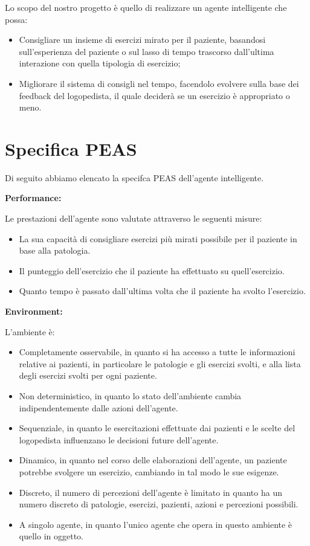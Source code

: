 \documentclass{article}
\begin{document}
    Lo scopo del nostro progetto è quello di realizzare un agente intelligente che possa:

    \begin{itemize}
        \item Consigliare un insieme di esercizi mirato per il paziente, basandosi sull'esperienza del paziente o sul lasso di tempo trascorso dall'ultima interazione con quella tipologia di esercizio;
        \item Migliorare il sistema di consigli nel tempo, facendolo evolvere sulla base dei feedback del logopedista, il quale deciderà se un esercizio è appropriato o meno.
    \end{itemize}


    \pagebreak
    \section{Specifica PEAS}

    Di seguito abbiamo elencato la specifca PEAS dell'agente intelligente.

    \textbf{Performance:}

    Le prestazioni dell’agente sono valutate attraverso le seguenti misure:

    \begin{itemize}
        \item La sua capacità di consigliare esercizi più mirati possibile per il paziente in base alla patologia.
        \item Il punteggio dell'esercizio che il paziente ha effettuato su quell'esercizio.
        \item Quanto tempo è passato dall'ultima volta che il paziente ha svolto l'esercizio.
    \end{itemize}

    \textbf{Environment:}

    L’ambiente è:

    \begin{itemize}
        \item Completamente osservabile, in quanto si ha accesso a tutte le informazioni relative ai pazienti, in particolare le patologie e gli esercizi svolti, e alla lista degli esercizi svolti per ogni paziente.
        \item Non deterministico, in quanto lo stato dell’ambiente cambia indipendentemente dalle azioni dell’agente.
        \item Sequenziale, in quanto le esercitazioni effettuate dai pazienti e le scelte del logopedista influenzano le decisioni future dell’agente.
        \item Dinamico, in quanto nel corso delle elaborazioni dell’agente, un paziente potrebbe svolgere un esercizio, cambiando in tal modo le sue esigenze.
        \item Discreto, il numero di percezioni dell’agente è limitato in quanto ha un numero discreto di patologie, esercizi, pazienti, azioni e percezioni possibili.
        \item A singolo agente, in quanto l’unico agente che opera in questo ambiente è quello in oggetto.
    \end{itemize}
\end{document}
